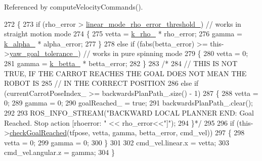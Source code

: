 Referenced by compute\+Velocity\+Commands().


\begin{DoxyCode}
272         \{
273             \textcolor{keywordflow}{if} (rho\_error > \hyperlink{classcl__move__base__z_1_1backward__local__planner_1_1BackwardLocalPlanner_a858efacf597a3a35c97aec9ca53e5900}{linear\_mode\_rho\_error\_threshold\_}) \textcolor{comment}{// works in
       straight motion mode}
274             \{
275                 vetta = \hyperlink{classcl__move__base__z_1_1backward__local__planner_1_1BackwardLocalPlanner_ad8a36184bfb011545c751109e23d3b98}{k\_rho\_} * rho\_error;
276                 gamma = \hyperlink{classcl__move__base__z_1_1backward__local__planner_1_1BackwardLocalPlanner_abf7a5a56de2ee41afba7e63c0628ec35}{k\_alpha\_} * alpha\_error;
277             \}
278             \textcolor{keywordflow}{else} \textcolor{keywordflow}{if} (fabs(betta\_error) >= this->\hyperlink{classcl__move__base__z_1_1backward__local__planner_1_1BackwardLocalPlanner_a9c5104d328041fcde5a3c02664abad48}{yaw\_goal\_tolerance\_}) \textcolor{comment}{// works in pure
       spinning mode}
279             \{
280                 vetta = 0;
281                 gamma = \hyperlink{classcl__move__base__z_1_1backward__local__planner_1_1BackwardLocalPlanner_a9f257183d87f1d732cb7e404f09905ad}{k\_betta\_} * betta\_error;
282             \}
283             \textcolor{comment}{/*}
284 \textcolor{comment}{            // THIS IS NOT TRUE, IF THE CARROT REACHES THE GOAL DOES NOT MEAN THE ROBOT IS}
285 \textcolor{comment}{            // IN THE CORRECT POSITION}
286 \textcolor{comment}{            else if (currentCarrotPoseIndex\_ >= backwardsPlanPath\_.size() - 1)}
287 \textcolor{comment}{            \{}
288 \textcolor{comment}{                vetta = 0;}
289 \textcolor{comment}{                gamma = 0;}
290 \textcolor{comment}{                goalReached\_ = true;}
291 \textcolor{comment}{                backwardsPlanPath\_.clear();}
292 \textcolor{comment}{}
293 \textcolor{comment}{                ROS\_INFO\_STREAM("BACKWARD LOCAL PLANNER END: Goal Reached. Stop action [rhoerror: " <<
       rho\_error<<"]");}
294 \textcolor{comment}{            \}*/}
295 
296             \textcolor{keywordflow}{if} (this->\hyperlink{classcl__move__base__z_1_1backward__local__planner_1_1BackwardLocalPlanner_a6c4363e82119a6a8a5a3bfe309280898}{checkGoalReached}(tfpose, vetta, gamma, betta\_error, cmd\_vel))
297             \{
298                 vetta = 0;
299                 gamma = 0;
300             \}
301 
302             cmd\_vel.linear.x = vetta;
303             cmd\_vel.angular.z = gamma;
304         \}
\end{DoxyCode}
